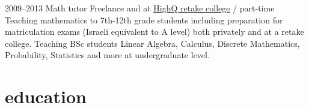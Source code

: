 \documentclass[]{friggeri-cv}
\begin{document}
\begin{entrylist}
  \entry
  {2009--2013}
  {Math tutor}
  {Freelance and at \href{https://www.high-q.co.il/}{HighQ retake college} / part-time}
  {
    Teaching mathematics to 7th-12th grade students including preparation for matriculation exams (Israeli equivalent to A level) both privately and at a retake college.
    Teaching BSc students Linear Algebra, Calculus, Discrete Mathematics, Probability, Statistics and more at undergraduate level.
  }

\end{entrylist}

\clearpage


\section{education}
\end{document}
